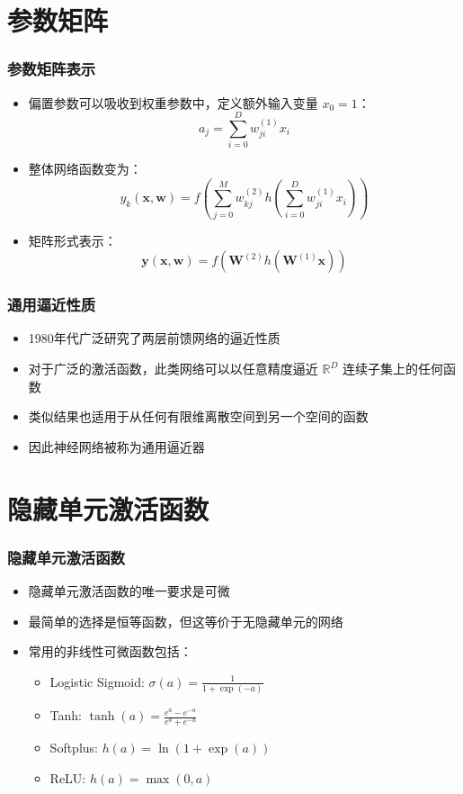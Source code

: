 \documentclass[t,aspectratio=169]{beamer} %
\begin{document}
\section{参数矩阵}
\begin{frame}
\frametitle{参数矩阵表示}
\begin{itemize}
    \item 偏置参数可以吸收到权重参数中，定义额外输入变量 $x_0 = 1$：
    \[
    a_j = \sum_{i=0}^{D} w_{ji}^{(1)} x_i
    \]
    \item 整体网络函数变为：
    \[
    y_k(\mathbf{x}, \mathbf{w}) = f\left( \sum_{j=0}^{M} w_{kj}^{(2)} h\left( \sum_{i=0}^{D} w_{ji}^{(1)} x_i \right) \right)
    \]
    \item 矩阵形式表示：
    \[
    \mathbf{y}(\mathbf{x}, \mathbf{w}) = f\left( \mathbf{W}^{(2)} h\left( \mathbf{W}^{(1)} \mathbf{x} \right) \right)
    \]
\end{itemize}
\end{frame}

\begin{frame}
\frametitle{通用逼近性质}
\begin{itemize}
    \item 1980年代广泛研究了两层前馈网络的逼近性质
    \item 对于广泛的激活函数，此类网络可以以任意精度逼近 $\mathbb{R}^D$ 连续子集上的任何函数
    \item 类似结果也适用于从任何有限维离散空间到另一个空间的函数
    \item 因此神经网络被称为通用逼近器
\end{itemize}
\end{frame}

\section{隐藏单元激活函数}
\begin{frame}
\frametitle{隐藏单元激活函数}
\begin{itemize}
    \item 隐藏单元激活函数的唯一要求是可微
    \item 最简单的选择是恒等函数，但这等价于无隐藏单元的网络
    \item 常用的非线性可微函数包括：
    \begin{itemize}
        \item Logistic Sigmoid: $\sigma(a) = \frac{1}{1 + \exp(-a)}$
        \item Tanh: $\tanh(a) = \frac{e^a - e^{-a}}{e^a + e^{-a}}$
        \item Softplus: $h(a) = \ln(1 + \exp(a))$
        \item ReLU: $h(a) = \max(0, a)$
    \end{itemize}
\end{itemize}
\end{frame}
\end{document}
